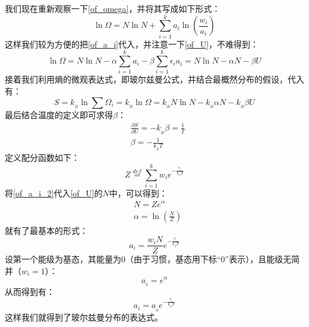 \begin{prove}
    我们现在重新观察一下\ref{of_omega}，并将其写成如下形式：
    \begin{equation}
        \ln\Omega = N\ln N + \sum_{i = 1}^{k} a_i \ln(\frac{w_i}{a_i})
    \end{equation}
    这样我们较为方便的把\ref{of_a_i}代入，并注意一下\ref{of_U}，不难得到：
    \begin{equation}
        \ln\Omega = N\ln N - \alpha \sum_{i = 1}^{k} a_i -\beta \sum_{i = 1}^{k}\epsilon_i a_i = N\ln N -\alpha N - \beta U
    \end{equation}
    接着我们利用熵的微观表达式，即玻尔兹曼公式，并结合最概然分布的假设，代入有：
    \begin{equation}
        S = k_{_B}\ln\sum \Omega_i = k_{_B}\ln\Omega =  k_{_B}N\ln N -k_{_B}\alpha N - k_{_B}\beta U
        \label{of_S}
    \end{equation}
    最后结合温度的定义即可求得$\beta$：
    \begin{equation}
        \begin{aligned}
             & \frac{\partial S}{\partial U} = -k_{_B}\beta =\frac{1}{T} \\
             & \beta = -\frac{1}{k_{_B}T}
        \end{aligned}
    \end{equation}
    定义配分函数如下：
    \begin{equation}
        Z \overset{def}{=} \sum_{i=1}^{k}w_i e^{-\tfrac{\epsilon_i}{k_{_B}T}}
    \end{equation}
    将\ref{of_a_i_2}代入\ref{of_U}的$N$中，可以得到：
    \begin{equation}
        \begin{aligned}
             & N = Ze^{\alpha}                      \\
             & \alpha = \ln\left(\frac{N}{Z}\right)
        \end{aligned}
    \end{equation}
    就有了最基本的形式：
    \begin{equation}
        a_i = \frac{w_{i}N}{Z} e^{-\tfrac{\epsilon_i}{k_{_B}T}}
        \label{of_a_i_3}
    \end{equation}
    设第一个能级为基态，其能量为0（由于习惯，基态用下标“0”表示），且能级无简并（$w_i=1$）：
    \begin{equation}
        a_{_0} = e^{\alpha}
    \end{equation}
    从而得到有：
    \begin{equation}
        a_i = a_{_0} e^{-\tfrac{\epsilon_i}{k_{_B}T}}
    \end{equation}
    这样我们就得到了玻尔兹曼分布的表达式。
\end{prove}
